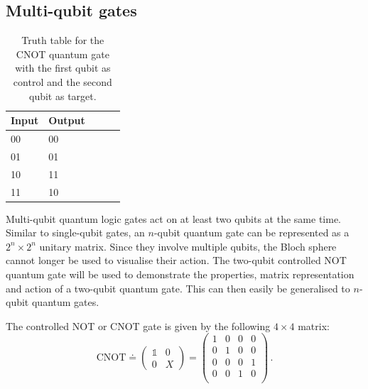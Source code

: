 \subsection{Multi-qubit gates}
\label{subsubsec:multiqubitgates}
\begin{table}[H]
\begin{center}
\begin{tabular}{l|lccc}\hline
Input & Output \\ \hline
00 & 00 \\
01 & 01 \\
10 & 11 \\
11 & 10 \\ \hline
\end{tabular}
\end{center}
\caption{Truth table for the CNOT quantum gate with the first qubit as control and the second qubit as target.}\vspace{1ex}
\label{tab:cnottruthtable}
\end{table}
Multi-qubit quantum logic gates act on at least two qubits at the same time. Similar to single-qubit gates, an $n$-qubit quantum gate can be represented as a $2^n\times2^n$ unitary matrix. Since they involve multiple qubits, the Bloch sphere cannot longer be used to visualise their action. The two-qubit controlled NOT quantum gate will be used to demonstrate the properties, matrix representation and action of a two-qubit quantum gate. This can then easily be generalised to $n$-qubit quantum gates.

The controlled NOT or CNOT gate is given by the following $4\times4$ matrix:
\begin{equation}
\mathrm{CNOT} \doteq \begin{pmatrix}
 \mathbb{1} & 0 \\ 
 0 & X
 \end{pmatrix} = \begin{pmatrix}
 1 & 0 & 0 & 0 \\ 
 0 & 1 & 0 & 0 \\
 0 & 0 & 0 & 1 \\
 0 & 0 & 1 & 0 \\
 \end{pmatrix}\, .
\end{equation}

